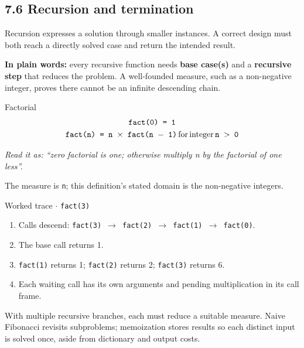 \documentclass[11pt]{article}
\begin{document}
\begin{keepsection}
\section{7.6 Recursion and termination}

Recursion expresses a solution through smaller instances. A correct design must both reach a directly solved case and return the intended result.

\begin{plainbox}\textbf{In plain words:} every recursive function needs \textbf{base case(s)} and a \textbf{recursive step} that reduces the problem. A well-founded measure, such as a non-negative integer, proves there cannot be an infinite descending chain.\end{plainbox}

\begin{equationcard}{Factorial}
\[ \begin{gathered} \texttt{fact(0) = 1} \\ \texttt{fact(n) = n \ensuremath{\times} fact(n \ensuremath{-} 1)}\, \text{for}\, \text{integer}\, \texttt{n \ensuremath{>} 0} \end{gathered} \]
{\small \emph{Read it as: “zero factorial is one; otherwise multiply n by the factorial of one less”.}\par The measure is \texttt{n}; this definition’s stated domain is the non-negative integers.}
\end{equationcard}

\begin{workedbox}{Worked trace \ensuremath{\cdot} \texttt{fact(3)}}
\begin{enumerate}
\item Calls descend: \texttt{fact(3) \ensuremath{\to} fact(2) \ensuremath{\to} fact(1) \ensuremath{\to} fact(0)}.
\item The base call returns 1.
\item \texttt{fact(1)} returns 1; \texttt{fact(2)} returns 2; \texttt{fact(3)} returns 6.
\item Each waiting call has its own arguments and pending multiplication in its call frame.
\end{enumerate}
\end{workedbox}

With multiple recursive branches, each must reduce a suitable measure. Naive Fibonacci revisits subproblems; memoization stores results so each distinct input is solved once, aside from dictionary and output costs.


\end{keepsection}
\end{document}
